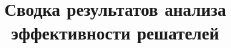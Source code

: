\documentclass[%
	11pt,
	a4paper,
	utf8,
		]{article}
\begin{document}
\title{Сводка результатов анализа эффективности решателей}


\date{}
\maketitle

\thispagestyle{fancy}




\newcommand\ccb[1]{\cellcolor{red!10}{#1}}
\newcommand\ccg[1]{\cellcolor{green!10}{#1}}


\def\nVarsA{106674}
\def\nBinVarsA{0}
\def\nIntVarsA{3069}
\def\nConssA{106029}

\def\firstSolHighsObjA{1.2296637}  %
\def\firstSolHighsTimeA{47.6 / 60}
\def\firstSolZyoptObjA{1.2313417}  %
\def\firstSolZyoptTimeA{7.1 / 60}

\newcommand{\cplexObjA}{1.228640082}  %
\newcommand{\zyoptObjA}{1.2285012}  %
\newcommand{\highsObjA}{1.2296637}  %
\newcommand{\cplexZyoptObjRelA}{(\fpeval{\cplexObjA} - \fpeval{\zyoptObjA}) / \fpeval{\cplexObjA} * 100}
\newcommand{\cplexHighsObjRelA}{(\fpeval{\cplexObjA} - \fpeval{\highsObjA}) / \fpeval{\cplexObjA} * 100}
\end{document}
